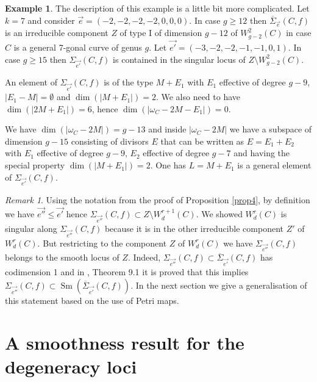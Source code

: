 \documentclass{article}
\DeclareMathOperator{\Sm}{Sm}
\theoremstyle{definition}
\newtheorem{example}{Example}
\theoremstyle{remark}
\newtheorem{remark}{Remark}
\begin{document}
\begin{example}\label{ex3}
The description of this example is a little bit more complicated.
Let $k=7$ and consider $\overrightarrow {e}=(-2,-2,-2,-2,0,0,0)$.
In case $g \geq 12$ then $\overline{\Sigma}_{\overrightarrow {e}}(C,f)$ is an irreducible component $Z$ of type I of dimension $g-12$ of $W^2_{g-2}(C)$ in case $C$ is a general 7-gonal curve of genus $g$.
Let $\overrightarrow {e'}=(-3,-2,-2,-1,-1,0,1)$.
In case $g \geq 15$ then $\Sigma_{\overrightarrow {e'}}(C,f)$ is contained in the singular locus of $Z \setminus W^2_{g-2}(C)$.

An element of $\Sigma _{\overrightarrow {e'}}(C,f)$ is of the type $M+E_1$ with $E_1$ effective of degree $g-9$, $\vert E_1-M \vert = \emptyset$ and $\dim (\vert M+E_1 \vert )=2$.
We also need to have $\dim (\vert 2M+E_1 \vert)=6$, hence $\dim (\vert \omega _C -2M-E_1 \vert )=0$.

We have $\dim (\vert \omega _C -2M \vert)=g-13$ and inside $\vert \omega _C-2M \vert$ we have a subspace of dimension $g-15$ consisting of divisors $E$ that can be written as $E=E_1+E_2$ with $E_1$ effective of degree $g-9$, $E_2$ effective of degree $g-7$ and having the special property $\dim (\vert M+E_1 \vert )=2$.
One has $L=M+E_1$ is a general element of $\Sigma_{\overrightarrow {e'}}(C,f)$.
\end{example}

\begin{remark}\label{rem3}
Using the notation from the proof of Proposition \ref{prop4}, by definition we have $\overrightarrow {e''} \leq \overrightarrow {e'}$ hence $\Sigma _{\overrightarrow {e''}}(C,f) \subset Z \setminus W_d^{r+1}(C)$.
We showed $W^r_d(C)$ is singular along $\Sigma_{\overrightarrow {e''}}(C,f)$ because it is in the other irreducible component $Z'$ of $W^r_d(C)$.
But restricting to the component $Z$ of $W^r_d(C)$ we have $\Sigma_{\overrightarrow {e''}}(C,f)$ belongs to the smooth locus of $Z$.
Indeed, $\Sigma_{\overrightarrow {e''}}(C,f) \subset \overline {\Sigma}_{\overrightarrow {e'}}(C,f)$ has codimension 1 and in \cite{ref6}, Theorem 9.1 it is proved that this implies $\Sigma _{\overrightarrow {e''}}(C,f) \subset \Sm (\overline{\Sigma}_{\overrightarrow {e'}}(C,f))$.
In the next section we give a generalisation of this statement based on the use of Petri maps.
\end{remark}

\section{A smoothness result for the degeneracy loci}\label{section4}
\end{document}
